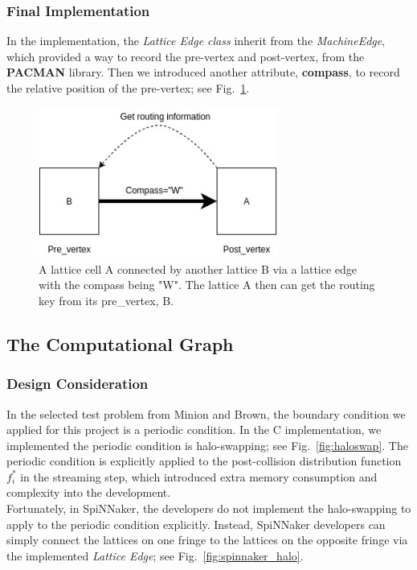 \subsubsection{Final Implementation}
In the implementation, the \textit{Lattice Edge class} inherit from the \textit{MachineEdge}, which provided a way to record the pre-vertex and post-vertex, from the \textbf{PACMAN} library. Then we introduced another attribute, \textbf{compass}, to record the relative position of the pre-vertex; see Fig.~\ref{fig:edge}.\\
\begin{figure}[tb]
   \centering
       \includegraphics[width=0.7\textwidth]{figures/edge.jpg}
       \caption{A lattice cell A connected by another lattice B via a lattice edge with the compass being "W". The lattice A then can get the routing key from its pre\_vertex, B.}
       \label{fig:edge}
\end{figure}

\subsection{The Computational Graph} \label{sec:tcg} 
\subsubsection{Design Consideration}
In the selected test problem from Minion and Brown\cite{minion1997performance}, the boundary condition we applied for this project is a periodic condition. In the C implementation, we implemented the periodic condition is halo-swapping; see Fig.~\ref{fig:haloswap}. The periodic condition is explicitly applied to the post-collision distribution function $f_i^{*}$ in the streaming step, which introduced extra memory consumption and complexity into the development.\\

Fortunately, in SpiNNaker, the developers do not implement the halo-swapping to apply to the periodic condition explicitly. Instead, SpiNNaker developers can simply connect the lattices on one fringe to the lattices on the opposite fringe via the implemented \textit{Lattice Edge}; see Fig.~\ref{fig:spinnaker_halo}.\\


